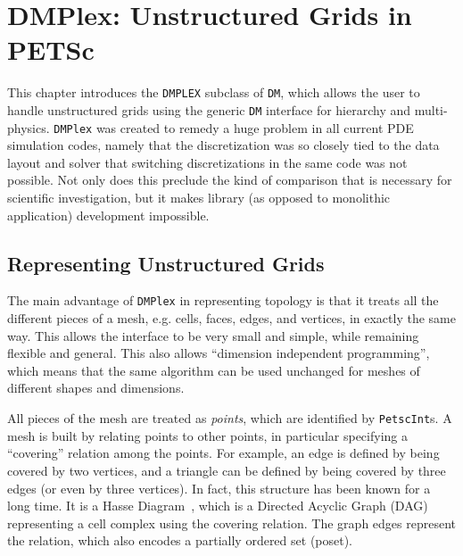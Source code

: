 \chapter{DMPlex: Unstructured Grids in PETSc}
\label{ch_unstructured}

This chapter introduces the \lstinline{DMPLEX} subclass of \lstinline{DM}, which allows the user to handle unstructured grids using the generic
\lstinline{DM} interface for hierarchy and multi-physics. \lstinline{DMPlex} was created to remedy a huge problem in all current PDE
simulation codes, namely that the discretization was so closely tied to the data layout and solver that switching
discretizations in the same code was not possible. Not only does this preclude the kind of comparison that is necessary
for scientific investigation, but it makes library (as opposed to monolithic application) development impossible.

\medskip \medskip

\section{Representing Unstructured Grids} 

The main advantage of \lstinline{DMPlex} in representing topology is that it treats all the different pieces of a mesh,
e.g. cells, faces, edges, and vertices, in exactly the same way. This allows the interface to be very small and simple, while
remaining flexible and general. This also allows ``dimension independent programming'', which means that the same
algorithm can be used unchanged for meshes of different shapes and dimensions.

All pieces of the mesh are treated as \textit{points}, which are identified by \lstinline{PetscInt}s. A mesh is built by relating
points to other points, in particular specifying a ``covering'' relation among the points. For example, an edge is
defined by being covered by two vertices, and a triangle can be defined by being covered by three edges (or even by
three vertices). In fact, this structure has been known for a long time. It is a Hasse Diagram~\cite{HasseDiagram},
which is a Directed Acyclic Graph (DAG) representing a cell complex using the covering relation. The graph edges
represent the relation, which also encodes a partially ordered set (poset).

